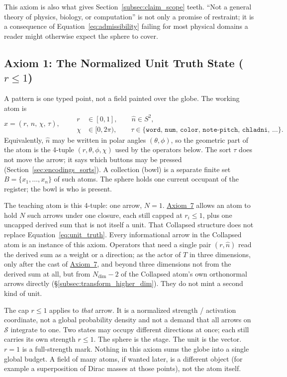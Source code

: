 \documentclass[12pt, a4paper]{article}
\begin{document}
This axiom is also what gives
Section~\ref{subsec:claim_scope} teeth. ``Not a general theory of
physics, biology, or computation'' is not only a promise of
restraint; it is a consequence of Equation~\eqref{eq:admissibility}
failing for most physical domains a reader might otherwise expect
the sphere to cover.

\subsection{Axiom 1: The Normalized Unit Truth State ($r \le 1$)}
\label{subsec:axiom1}
A pattern is one typed point, not a field painted over the globe. The working atom is
\begin{equation}
    x = (r,\,\hat n,\,\chi,\,\tau),
    \qquad
    \begin{aligned}
    r &\in [0,1],
    \qquad
    \hat n \in S^2,\\
    \chi &\in [0,2\pi),
    \qquad
    \tau \in \{\mathtt{word},\,\mathtt{num},\,\mathtt{color},\,\mathtt{note\text{-}pitch},\,\mathtt{chladni},\,\ldots\}.
    \end{aligned}
    \label{eq:unit_truth}
\end{equation}
Equivalently, $\hat n$ may be written in polar angles $(\theta,\phi)$, so the geometric part of the atom is the 4-tuple $(r,\theta,\phi,\chi)$ used by the operators below. The sort $\tau$ does not move the arrow; it says which buttons may be pressed (Section~\ref{sec:encodings_sorts}). A collection (bowl) is a separate finite set $B=\{x_1,\ldots,x_n\}$ of such atoms. The sphere holds one current occupant of the register; the bowl is who is present.

The teaching atom is this 4-tuple: one arrow, $N=1$. \hyperref[subsec:axiom_v1_metrics]{Axiom~7} allows an atom to hold $N$ such arrows under one closure, each still capped at $r_i\le 1$, plus one uncapped derived sum that is not itself a unit. That Collapsed structure does not replace Equation~\eqref{eq:unit_truth}. Every informational arrow in the Collapsed atom is an instance of this axiom. Operators that need a single pair $(r,\hat n)$ read the derived sum as a weight or a direction; as the actor of $T$ in three dimensions, only after the cast of \hyperref[subsec:axiom_v1_metrics]{Axiom~7}, and beyond three dimensions not from the derived sum at all, but from $N_{\mathrm{dim}}-2$ of the Collapsed atom's own orthonormal arrows directly (\S\ref{subsec:transform_higher_dim}). They do not mint a second kind of unit.

The cap $r \le 1$ applies to \emph{that} arrow. It is a normalized strength / activation coordinate, not a global probability density and not a demand that all arrows on $\mathcal{S}$ integrate to one. Two states may occupy
different directions at once; each still carries its own strength
$r\le 1$. The sphere is the stage. The unit is the vector.
$r=1$ is a full-strength mark. Nothing in this axiom sums the globe
into a single global budget. A field of many atoms, if wanted later, is a different object (for example a superposition of Dirac masses at those points), not the atom itself.
\end{document}
